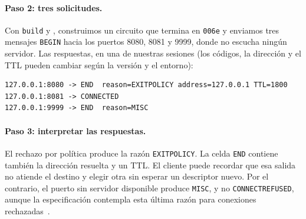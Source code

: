 \paragraph{Paso 2: tres solicitudes.} Con \texttt{build} y , construimos un circuito que termina en \texttt{006e} y enviamos tres mensajes \texttt{BEGIN} hacia los puertos 8080, 8081 y 9999, donde no escucha ningún servidor. Las respuestas, en una de nuestras sesiones (los códigos, la dirección y el TTL pueden cambiar según la versión y el entorno):
\begin{lstlisting}[numbers=none]
127.0.0.1:8080 -> END  reason=EXITPOLICY address=127.0.0.1 TTL=1800
127.0.0.1:8081 -> CONNECTED
127.0.0.1:9999 -> END  reason=MISC
\end{lstlisting}

\paragraph{Paso 3: interpretar las respuestas.} El rechazo por política produce la razón \texttt{EXITPOLICY}. La celda \texttt{END} contiene también la dirección resuelta y un TTL. El cliente puede recordar que esa salida no atiende el destino y elegir otra sin esperar un descriptor nuevo. Por el contrario, el puerto sin servidor disponible produce \texttt{MISC}, y no \texttt{CONNECTREFUSED}, aunque la especificación contempla esta última razón para conexiones rechazadas~.

